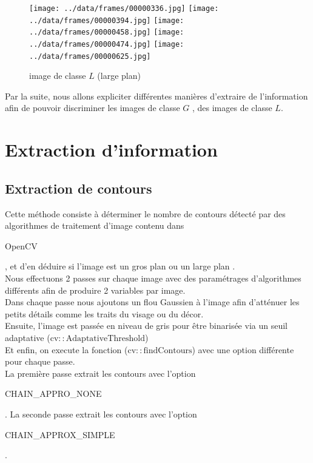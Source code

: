 \documentclass{book}
\begin{document}
\begin{figure}[H]
\begin{center}
\texttt{[image: ../data/frames/00000336.jpg]}
\texttt{[image: ../data/frames/00000394.jpg]}
\texttt{[image: ../data/frames/00000458.jpg]}
\texttt{[image: ../data/frames/00000474.jpg]}
\texttt{[image: ../data/frames/00000625.jpg]}
\end{center}
\caption{image de classe $L$ (large plan)}
\label{classeL}
\end{figure}

Par la suite, nous allons expliciter différentes manières d'extraire de l'information afin de pouvoir discriminer les images de classe $G$
, des images de classe $L$.

\chapter{Extraction d'information}
\section{Extraction de contours}

Cette méthode consiste à déterminer le nombre de contours détecté par des algorithmes de traitement
d'image contenu dans \begin{itshape}OpenCV\end{itshape}\cite{opencv_library}, et d'en déduire si l'image est un \og gros plan \fg{} ou un \og large plan \fg{}.\\
Nous effectuons 2 passes sur chaque image avec des paramétrages d'algorithmes différents afin de
produire 2 variables par image.\\
Dans chaque passe nous ajoutons un flou Gaussien à l'image afin d'atténuer les petits détails comme les
traits du visage ou du décor.\\
Ensuite, l'image est passée en niveau de gris pour être binarisée via un seuil adaptative ($\mathrm{cv::AdaptativeThreshold}$)\\
Et enfin, on execute la fonction ($\mathrm{cv::findContours}$) avec une option différente pour chaque passe.\\

La première passe extrait les contours avec l'option \begin{itshape}CHAIN\_APPRO\_NONE\end{itshape}. 
La seconde passe extrait les contours avec l'option \begin{itshape}CHAIN\_APPROX\_SIMPLE\end{itshape}. 
\end{document}
